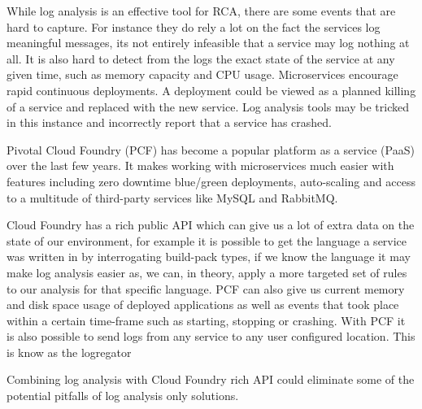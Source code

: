 While log analysis is an effective tool for RCA, there are some events that are hard to capture. For instance they do rely a lot on the fact the services log meaningful messages, its not entirely infeasible that a service may log nothing at all. It is also hard to detect from the logs the exact state of the service at any given time, such as memory capacity and CPU usage. Microservices encourage rapid continuous deployments\cite{villamizar2015evaluating}. A deployment could be viewed as a planned killing of a service and replaced with the new service. Log analysis tools may be tricked in this instance and incorrectly report that a service has crashed. 

Pivotal Cloud Foundry\cite{6924673} (PCF) has become a popular platform as a service (PaaS) over the last few years. It makes working with microservices much easier with features including zero downtime blue/green deployments, auto-scaling and access to a multitude of third-party services like MySQL and RabbitMQ.

Cloud Foundry has a rich public API which can give us a lot of extra data on the state of our environment, for example it is possible to get the language a service was written in by interrogating build-pack types, if we know the language it may make log analysis easier as, we can, in theory, apply a more targeted set of rules to our analysis for that specific language. PCF can also give us current memory and disk space usage of deployed applications as well as events that took place within a certain time-frame such as starting, stopping or crashing. With PCF it is also possible to send logs from any service to any user configured location. This is know as the logregator\cite{winn2017cloud}

Combining log analysis with Cloud Foundry rich API could eliminate some of the potential pitfalls of log analysis only solutions. 